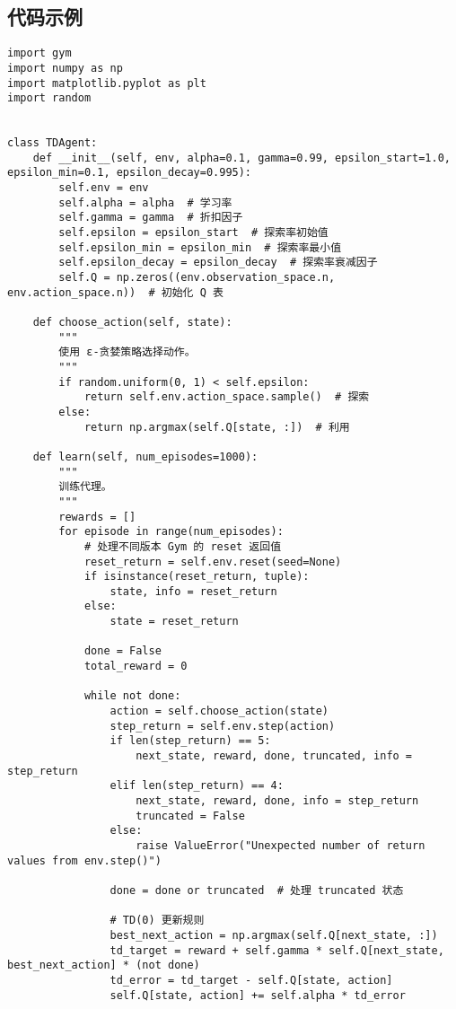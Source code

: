\subsection*{代码示例}
\begin{lstlisting}
import gym
import numpy as np
import matplotlib.pyplot as plt
import random


class TDAgent:
    def __init__(self, env, alpha=0.1, gamma=0.99, epsilon_start=1.0, epsilon_min=0.1, epsilon_decay=0.995):
        self.env = env
        self.alpha = alpha  # 学习率
        self.gamma = gamma  # 折扣因子
        self.epsilon = epsilon_start  # 探索率初始值
        self.epsilon_min = epsilon_min  # 探索率最小值
        self.epsilon_decay = epsilon_decay  # 探索率衰减因子
        self.Q = np.zeros((env.observation_space.n, env.action_space.n))  # 初始化 Q 表

    def choose_action(self, state):
        """
        使用 ε-贪婪策略选择动作。
        """
        if random.uniform(0, 1) < self.epsilon:
            return self.env.action_space.sample()  # 探索
        else:
            return np.argmax(self.Q[state, :])  # 利用

    def learn(self, num_episodes=1000):
        """
        训练代理。
        """
        rewards = []
        for episode in range(num_episodes):
            # 处理不同版本 Gym 的 reset 返回值
            reset_return = self.env.reset(seed=None)
            if isinstance(reset_return, tuple):
                state, info = reset_return
            else:
                state = reset_return

            done = False
            total_reward = 0

            while not done:
                action = self.choose_action(state)
                step_return = self.env.step(action)
                if len(step_return) == 5:
                    next_state, reward, done, truncated, info = step_return
                elif len(step_return) == 4:
                    next_state, reward, done, info = step_return
                    truncated = False
                else:
                    raise ValueError("Unexpected number of return values from env.step()")

                done = done or truncated  # 处理 truncated 状态

                # TD(0) 更新规则
                best_next_action = np.argmax(self.Q[next_state, :])
                td_target = reward + self.gamma * self.Q[next_state, best_next_action] * (not done)
                td_error = td_target - self.Q[state, action]
                self.Q[state, action] += self.alpha * td_error


\end{lstlisting}
